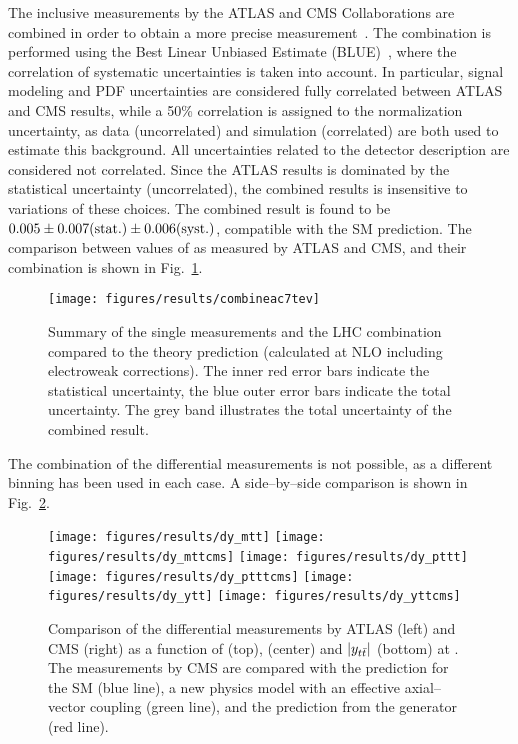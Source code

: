 The inclusive \ac{} measurements by the ATLAS and CMS Collaborations
are combined in order to obtain a more precise
measurement~\cite{ATLAS-CONF-2014-012}. 
The combination is performed using the Best Linear Unbiased Estimate
(BLUE)~\cite{Lyons:1988rp,Valassi:2003mu}, where the correlation of
systematic uncertainties is taken into account. In particular, signal
modeling and PDF uncertainties are considered fully correlated between
ATLAS and CMS results, while a 50\% correlation is assigned to the
\wjets{} normalization uncertainty, as data (uncorrelated) and
simulation (correlated) are both used to estimate this
background. All uncertainties related to the detector description
are considered not correlated. Since the ATLAS results is
dominated by the statistical uncertainty (uncorrelated), the combined
results is insensitive to variations of these choices. The combined
result is found to be $0.005\pm0.007(\rm{stat.})\pm0.006(\rm{syst.})$,
compatible with the SM prediction. The comparison between values of
\ac{} as measured by ATLAS and CMS, and their combination is shown in
Fig.~\ref{fig:combineac}.
\begin{figure}[!htb]\centering
  \texttt{[image: figures/results/combineac7tev]} 
  \caption{Summary of the single \ac{} measurements and the LHC
    combination compared to the theory prediction (calculated at NLO
    including electroweak corrections). The inner red error bars
    indicate the statistical uncertainty, the blue outer error bars
    indicate the total uncertainty. The grey band illustrates the
    total uncertainty of the combined result.} 
  \label{fig:combineac}
\end{figure}
The combination of the differential measurements is not possible, as a
different binning has been used in each case. A side--by--side
comparison is shown in Fig.~\ref{fig:comparediff7tev}. 

\begin{figure}[!htb]\centering
  \texttt{[image: figures/results/dy\_mtt]} 
  \texttt{[image: figures/results/dy\_mttcms]} 
  \texttt{[image: figures/results/dy\_pttt]} 
  \texttt{[image: figures/results/dy\_ptttcms]} 
  \texttt{[image: figures/results/dy\_ytt]} 
  \texttt{[image: figures/results/dy\_yttcms]} 
  \caption{Comparison of the differential \ac{} measurements by ATLAS
    (left) and CMS (right) as a function of \mtt{} (top), \pttt{}
    (center) and $|y_{t\bar{t}}{}|$ (bottom) at \seventev{}. The measurements
    by CMS are compared with the prediction for the SM (blue line), a
    new physics model with an
    effective axial--vector coupling (green line), and the prediction from
    the \powheg{} generator (red line).} 
  \label{fig:comparediff7tev}
\end{figure}

